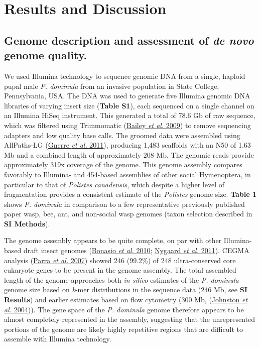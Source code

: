 \section{Results and Discussion}

\subsection{Genome description and assessment of \textit{de novo} genome
quality.} We used Illumina technology to sequence genomic DNA from a
single, haploid pupal male \textit{P. dominula} from an invasive
population in State College, Pennsylvania, USA. The DNA was used to
generate five Illumina genomic DNA libraries of varying insert size
(\textbf{Table S1}), each sequenced on a single channel on an Illumina
HiSeq instrument. This generated a total of 78.6 Gb of raw sequence,
which was filtered using Trimmomatic
(\protect\hyperlink{ux5fENREFux5f1}{Bailey \textit{et al.} 2009}) to
remove sequencing adapters and low quality base calls. The groomed data
were assembled using AllPaths-LG
(\protect\hyperlink{ux5fENREFux5f14}{Gnerre \textit{et al.} 2011}),
producing 1,483 scaffolds with an N50 of 1.63 Mb and a combined length
of approximately 208 Mb. The genomic reads provide approximately 319x
coverage of the genome. This genome assembly compares favorably to
Illumina- and 454-based assemblies of other social Hymenoptera, in
particular to that of \textit{Polistes canadensis}, which despite a higher
level of fragmentation provides a consistent estimate of the
\textit{Polistes} genome size. \textbf{Table 1} shows \textit{P. dominula}
in comparison to a few representative previously published paper wasp,
bee, ant, and non-social wasp genomes (taxon selection described in
\textbf{SI Methods}).

The genome assembly appears to be quite complete, on par with other
Illumina-based draft insect genomes
(\protect\hyperlink{ux5fENREFux5f5}{Bonasio \textit{et al.} 2010};
\protect\hyperlink{ux5fENREFux5f37}{Nygaard \textit{et al.} 2011}). CEGMA
analysis (\protect\hyperlink{ux5fENREFux5f42}{Parra \textit{et al.} 2007})
showed 246 (99.2\%) of 248 ultra-conserved core eukaryote genes to be
present in the genome assembly. The total assembled length of the genome
approaches both \textit{in silico} estimates of the \textit{P. dominula}
genome size based on \textit{k}-mer distributions in the sequence data
(246 Mb, see \textbf{SI Results}) and earlier estimates based on flow
cytometry (300 Mb, (\protect\hyperlink{ux5fENREFux5f23}{Johnston
\textit{et al.} 2004})). The gene space of the \textit{P. dominula} genome
therefore appears to be almost completely represented in the assembly,
suggesting that the unrepresented portions of the genome are likely
highly repetitive regions that are difficult to assemble with Illumina
technology.

